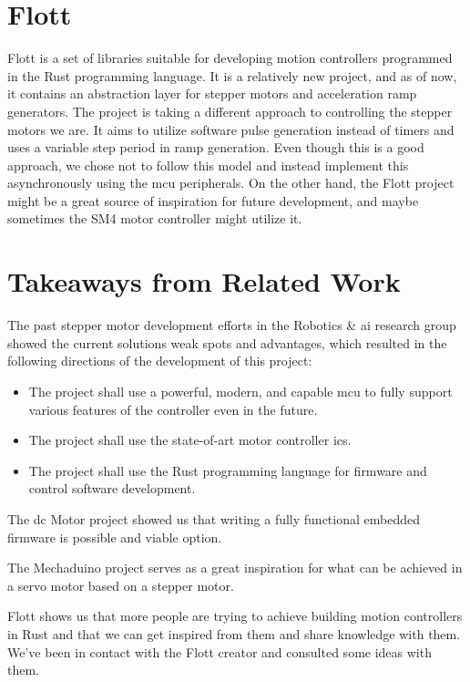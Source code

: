 \section{Flott}
\label{sec:flott}
Flott is a set of libraries suitable for developing motion controllers programmed in the Rust programming language\cite{braun_flott_nodate}.
It is a relatively new project, and as of now, it contains an abstraction layer for stepper motors and acceleration ramp generators.
The project is taking a different approach to controlling the stepper motors we are.
It aims to utilize software pulse generation instead of timers and uses a variable step period in ramp generation.
Even though this is a good approach, we chose not to follow this model and instead implement this asynchronously using the \acs{mcu} peripherals.
On the other hand, the Flott project might be a great source of inspiration for future development, and maybe sometimes the SM4 motor controller might utilize it.

\section{Takeaways from Related Work}
\label{sec:related-work-takeaways}
The past stepper motor development efforts in the Robotics \& \acs{ai} research group showed the current solutions weak spots and advantages, which resulted in the following directions of the development of this project:
\begin{itemize}
    \item The project shall use a powerful, modern, and capable \acs{mcu} to fully support various features of the controller even in the future.
    \item The project shall use the state-of-art motor controller \acs{ic}s.
    \item The project shall use the Rust programming language for firmware and control software development.
\end{itemize}

The \acs{dc} Motor project showed us that writing a fully functional embedded firmware is possible and viable option.

The Mechaduino project serves as a great inspiration for what can be achieved in a servo motor based on a stepper motor.

Flott shows us that more people are trying to achieve building motion controllers in Rust and that we can get inspired from them and share knowledge with them.
We've been in contact with the Flott creator and consulted some ideas with them.
